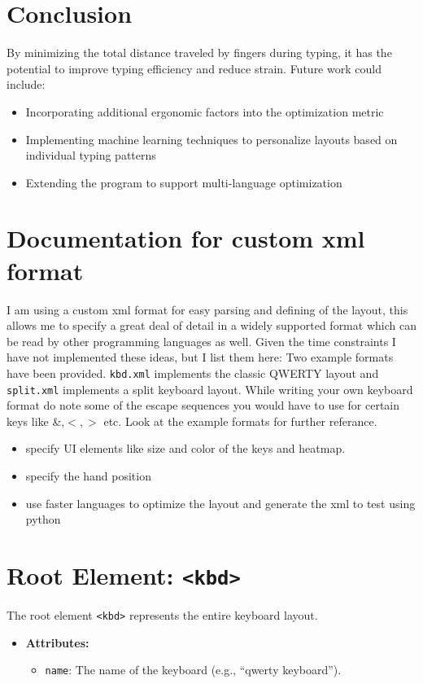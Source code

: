\documentclass{article}
\begin{document}
\section{Conclusion}
By minimizing the total distance traveled by fingers during typing, it has the potential to improve typing efficiency and reduce strain. Future work could include:
\begin{itemize}
    \item Incorporating additional ergonomic factors into the optimization metric
    \item Implementing machine learning techniques to personalize layouts based on individual typing patterns
    \item Extending the program to support multi-language optimization
\end{itemize}

\section{Documentation for custom xml format}
I am using a custom xml format for easy parsing and defining of the layout, this allows me to specify a great deal of detail in a widely supported format which 
can be read by other programming languages as well. Given the time constraints I have not implemented these ideas, but I list them here:
Two example formats have been provided. \texttt{kbd.xml} implements the classic QWERTY layout and \texttt{split.xml} implements
a split keyboard layout. While writing your own keyboard format do note some of the escape sequences you would have to use 
for certain keys like \&,$<, >$ etc. Look at the example formats for further referance.
\begin{itemize}
	\item specify UI elements like size and color of the keys and heatmap.
	\item specify the hand position
	\item use faster languages to optimize the layout and generate the xml to test using python
\end{itemize}

\section{Root Element: \texttt{<kbd>}}
The root element \texttt{<kbd>} represents the entire keyboard layout.

\begin{itemize}
    \item \textbf{Attributes:}
    \begin{itemize}
        \item \texttt{name}: The name of the keyboard (e.g., ``qwerty keyboard'').
    \end{itemize}
\end{itemize}
\end{document}
